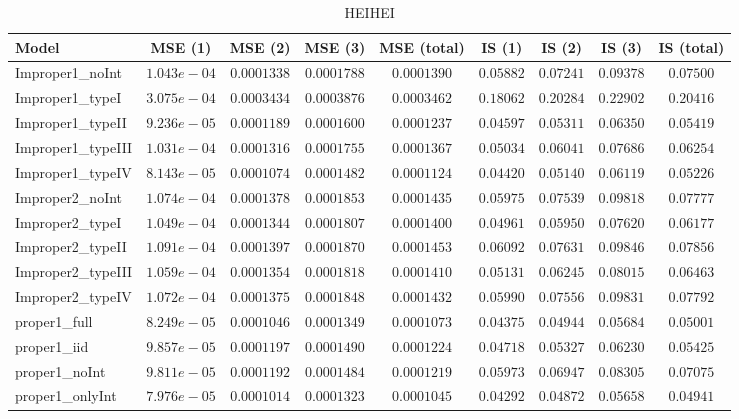 \begin{table}

\caption{\label{tab:model-choice-sc4}HEIHEI}
\centering
\begin{tabular}{lcccccccc}
\hline
Model  & MSE (1) & MSE (2) & MSE (3) & MSE (total) & IS (1) & IS (2) & IS (3) & \multicolumn{1}{c}{IS (total)} \\ 
\hline
Improper1_noInt  & $1.043e-04$ & $0.0001338$ & $0.0001788$ & $0.0001390$ & $0.05882$ & $0.07241$ & $0.09378$ & $0.07500$ \\
Improper1_typeI  & $3.075e-04$ & $0.0003434$ & $0.0003876$ & $0.0003462$ & $0.18062$ & $0.20284$ & $0.22902$ & $0.20416$ \\
Improper1_typeII  & $9.236e-05$ & $0.0001189$ & $0.0001600$ & $0.0001237$ & $0.04597$ & $0.05311$ & $0.06350$ & $0.05419$ \\
Improper1_typeIII  & $1.031e-04$ & $0.0001316$ & $0.0001755$ & $0.0001367$ & $0.05034$ & $0.06041$ & $0.07686$ & $0.06254$ \\
Improper1_typeIV  & $8.143e-05$ & $0.0001074$ & $0.0001482$ & $0.0001124$ & $0.04420$ & $0.05140$ & $0.06119$ & $0.05226$ \\
Improper2_noInt  & $1.074e-04$ & $0.0001378$ & $0.0001853$ & $0.0001435$ & $0.05975$ & $0.07539$ & $0.09818$ & $0.07777$ \\
Improper2_typeI  & $1.049e-04$ & $0.0001344$ & $0.0001807$ & $0.0001400$ & $0.04961$ & $0.05950$ & $0.07620$ & $0.06177$ \\
Improper2_typeII  & $1.091e-04$ & $0.0001397$ & $0.0001870$ & $0.0001453$ & $0.06092$ & $0.07631$ & $0.09846$ & $0.07856$ \\
Improper2_typeIII  & $1.059e-04$ & $0.0001354$ & $0.0001818$ & $0.0001410$ & $0.05131$ & $0.06245$ & $0.08015$ & $0.06463$ \\
Improper2_typeIV  & $1.072e-04$ & $0.0001375$ & $0.0001848$ & $0.0001432$ & $0.05990$ & $0.07556$ & $0.09831$ & $0.07792$ \\
proper1_full  & $8.249e-05$ & $0.0001046$ & $0.0001349$ & $0.0001073$ & $0.04375$ & $0.04944$ & $0.05684$ & $0.05001$ \\
proper1_iid  & $9.857e-05$ & $0.0001197$ & $0.0001490$ & $0.0001224$ & $0.04718$ & $0.05327$ & $0.06230$ & $0.05425$ \\
proper1_noInt  & $9.811e-05$ & $0.0001192$ & $0.0001484$ & $0.0001219$ & $0.05973$ & $0.06947$ & $0.08305$ & $0.07075$ \\
proper1_onlyInt  & $7.976e-05$ & $0.0001014$ & $0.0001323$ & $0.0001045$ & $0.04292$ & $0.04872$ & $0.05658$ & $0.04941$ \\

\end{tabular}
\end{table}

